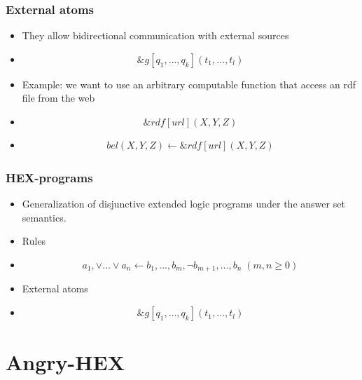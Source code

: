 \documentclass[smaller, dvipsnames]{beamer}
\newcommand{\ah}{Angry-HEX\xspace}
\begin{document}
\begin{frame}
    \frametitle{External atoms}
    \begin{itemize}
    	\item<1-> They allow bidirectional communication with external sources
    	\item<2->[] \[ \&g[q_1,\dots,q_k](t_1,\dots,t_l) \]
    	\item<3-> Example: we want to use an arbitrary computable function that access an rdf file from the web
    	\item<4->[] \[ \&rdf[url](X,Y,Z) \]
    	\item<5->[] 
    		\begin{align*}
				bel(X,Y,Z) \leftarrow \&rdf[url](X,Y,Z)
    		\end{align*}
    \end{itemize}
\end{frame}

\begin{frame}
    \frametitle{HEX-programs}
    \begin{itemize}
    	\item<1-> Generalization of disjunctive extended logic programs under the answer set semantics.
    	\item<2-> Rules
    	\item<2->[] \[ a_1, \lor \dots \lor a_n \leftarrow b_1, \dots , b_m, \neg b_{m+1}, \dots, b_n \; (m,n \geq 0)\]
    	\item<3-> External atoms
    	\item<3->[] \[ \&g[q_1,\dots,q_k](t_1,\dots,t_l) \]
    \end{itemize}
\end{frame}

\section{\ah}
\end{document}
